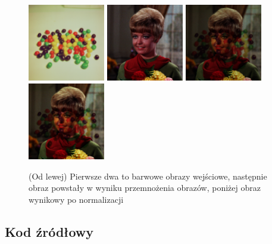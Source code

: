 \documentclass[final,a4paper,openany,12pt]{mwbk}
\begin{document}
\begin{figure}[H]
	\begin{center}
		\includegraphics[width=0.3\textwidth]{2/2Color_Multipl_Img1_Original}
		\includegraphics[width=0.3\textwidth]{2/2Color_Multipl_Img2_Original}
		\includegraphics[width=0.3\textwidth]{2/2Color_Multipl_Img_Result}
		\includegraphics[width=0.3\textwidth]{2/2Color_Multipl_Img_Result_Norm}
	\end{center}
	\caption{(Od lewej) Pierwsze dwa to barwowe obrazy wejściowe, następnie obraz powstały w wyniku przemnożenia obrazów, poniżej obraz wynikowy po normalizacji }
\end{figure}

\subsection*{Kod źródłowy}
\end{document}
